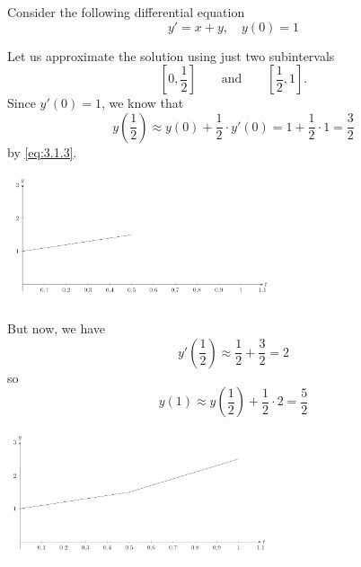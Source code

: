\documentclass{ximera}
\begin{document}
\begin{example}\label{ex:eulerIntro1}

Consider the following differential equation
$$y' = x+y,\quad y(0)=1$$
 
Let us approximate the solution using just two subintervals
$$
\left[0,\frac{1}{2}\right]\qquad\text{and}\qquad \left[\frac{1}{2},1\right].
$$
Since $y'(0) = 1$, we know that
$$
y\left(\frac{1}{2}\right)\approx y(0)+\frac{1}{2}\cdot y'(0)= 1+ \frac{1}{2}\cdot 1 = \frac{3}{2}
$$
by \eqref{eq:3.1.3}.

\begin{image}
 \includegraphics[height=1.5in]{fig030101.jpg} 
\end{image}


But now, we have
$$
y'\left(\frac{1}{2}\right) \approx \frac{1}{2}+\frac{3}{2} = 2
$$
so
$$
y(1) \approx  y\left(\frac{1}{2}\right)+\frac{1}{2} \cdot 2= \frac{5}{2}
$$

\begin{image}
 \includegraphics[height=1.5in]{fig030102.jpg} 
\end{image}


\end{example}
\end{document}
